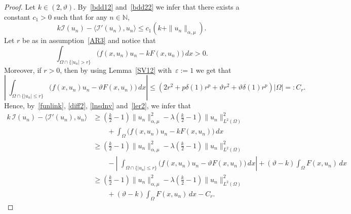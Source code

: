 \documentclass[12pt,a4paper,intlimits,sumlimits]{amsart}
\def \N {\mathbb{N}}
\theoremstyle{definition}
\theoremstyle{plain}
\numberwithin{equation}{section}
\renewcommand{\le}{\leqslant}
\renewcommand{\ge}{\geqslant}
\begin{document}
\begin{proof}
Let $k\in (2, \vartheta)$. By~\eqref{bdd12} and~\eqref{bdd22} we infer that there exists a constant $c_1>0$ such that for any $n\in\N$,
\begin{equation}\label{ndkjsc}
k \mathcal I(u_n) -\langle \mathcal I'(u_n), u_n\rangle \le c_1 (k +\|u_n\|_{\alpha, \mu}).
\end{equation}
Let $r$ be as in assumption~\eqref{AR3} and notice that
\begin{equation}\label{lnsdnv}
\int_{\Omega\cap\{|u_n|> r\}} \Big(f(x, u_n) u_n -k F(x, u_n)\Big)\,dx >0.
\end{equation}
Moreover, if $r>0$, then by using Lemma~\ref{SV12} with~$\varepsilon:=1$ we get that
\begin{equation}\label{ler2}
\left|\;\int_{\Omega\cap\{|u_n|\le r\}}  \big(f(x, u_n) u_n -\vartheta F(x, u_n)\big) \,dx\right| \le \left(2r^2 +p\delta(1) r^p + \vartheta r^2 +\vartheta\delta(1) r^p\right)|\Omega|=:C_r.
\end{equation}
Hence, by~\eqref{funlink}, \eqref{diff2},
\eqref{lnsdnv} and~\eqref{ler2}, we infer that
\[
\begin{split}
k\, \mathcal I(u_n) -\langle \mathcal I'(u_n), u_n\rangle &\ge\left(\frac{k}{2}-1\right)\|u_n\|^2_{\alpha, \mu}-\lambda\left(\frac{k}{2}-1\right)\|u_n\|^2_{L^2(\Omega)} \\
&\qquad+\int_\Omega \big(f(x, u_n) u_n -k F(x, u_n)\big) \,dx\\
& \ge\left(\frac{k}{2}-1\right)\|u_n\|^2_{\alpha, \mu}-\lambda\left(\frac{k}{2}-1\right)\|u_n\|^2_{L^2(\Omega)}\\
&\qquad - \left|\;\int_{\Omega\cap\{|u_n|\le r\}}  \Big(f(x, u_n) u_n -\vartheta F(x, u_n)\Big) \,dx\right| +(\vartheta -k)\int_\Omega F(x, u_n) \,dx\\
&\ge\left(\frac{k}{2}-1\right)\|u_n\|^2_{\alpha, \mu}-\lambda\left(\frac{k}{2}-1\right)\|u_n\|^2_{L^2(\Omega)}\\
&\qquad +(\vartheta -k)\int_\Omega F(x, u_n) \,dx- C_r.
\end{split}
\]


\end{proof}
\end{document}
